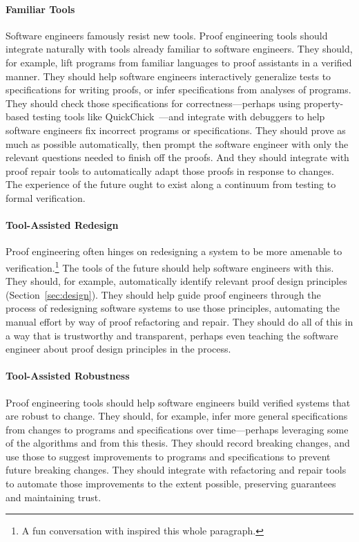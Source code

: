 \paragraph{Familiar Tools}
Software engineers famously resist new tools.
Proof engineering tools should integrate naturally with tools already familiar to software engineers.
They should, for example, lift programs from familiar languages to proof assistants in a verified manner.
They should help software engineers interactively generalize tests to specifications for writing proofs,
or infer specifications from analyses of programs.
They should check those specifications for correctness---perhaps using property-based testing tools 
like QuickChick~\cite{Paraskevopoulou2015, lampropoulos2017generating}---and integrate with debuggers to help software engineers 
fix incorrect programs or specifications.
They should prove as much as possible automatically, then prompt the software engineer with only the relevant questions
needed to finish off the proofs.
And they should integrate with proof repair tools to automatically adapt those proofs in response to changes.
The experience of the future ought to exist along a continuum from testing to formal verification.

\paragraph{Tool-Assisted Redesign} 
Proof engineering often hinges on redesigning a system to be more amenable to verification.\footnote{A fun conversation with  inspired this whole paragraph.}
The tools of the future should help software engineers with this.
They should, for example, automatically identify relevant proof design principles (Section~\ref{sec:design}).
They should help guide proof engineers through the process of redesigning software systems to use those principles,
automating the manual effort by way of proof refactoring and repair.
They should do all of this in a way that is trustworthy and transparent,
perhaps even teaching the software engineer about proof design principles in the process.

\paragraph{Tool-Assisted Robustness}
Proof engineering tools should help software engineers build verified systems that are robust to change.
They should, for example, infer more general specifications from changes to programs and specifications over time---perhaps
leveraging some of the  algorithms and  from this thesis.
They should record breaking changes, and use those to suggest improvements to programs and specifications to prevent future breaking changes.
They should integrate with refactoring and repair tools to automate those improvements to the extent possible,
preserving guarantees and maintaining trust.

